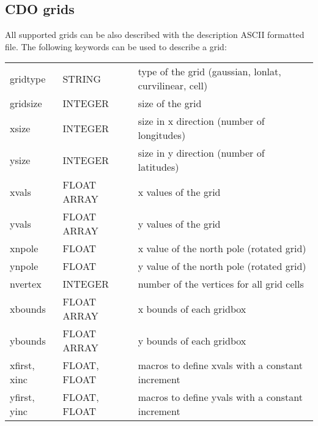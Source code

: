 \subsection{CDO grids}

All supported grids can be also described with the \CDO description ASCII formatted file.
The following keywords can be used to describe a grid:

\vspace{3mm}
\begin{tabular}[b]{lll}
gridtype     & STRING       & type of the grid (gaussian, lonlat, curvilinear, cell) \\
gridsize     & INTEGER      & size of the grid \\
xsize        & INTEGER      & size in x direction (number of longitudes) \\
ysize        & INTEGER      & size in y direction (number of latitudes) \\
xvals        & FLOAT ARRAY  & x values of the grid \\
yvals        & FLOAT ARRAY  & y values of the grid \\
xnpole       & FLOAT        & x value of the north pole (rotated grid) \\
ynpole       & FLOAT        & y value of the north pole (rotated grid) \\
nvertex      & INTEGER      & number of the vertices for all grid cells \\
xbounds      & FLOAT ARRAY  & x bounds of each gridbox \\
ybounds      & FLOAT ARRAY  & y bounds of each gridbox \\
xfirst, xinc & FLOAT, FLOAT & macros to define xvals with a constant increment \\
yfirst, yinc & FLOAT, FLOAT & macros to define yvals with a constant increment \\
\end{tabular}

